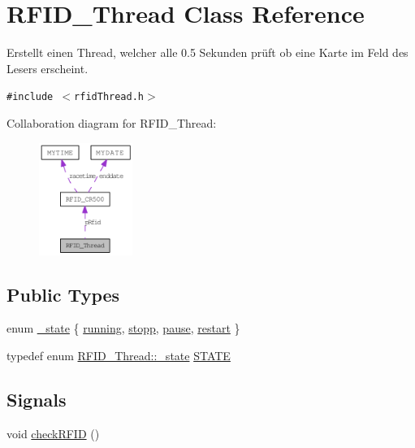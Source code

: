 \hypertarget{class_r_f_i_d___thread}{
\section{RFID\_\-Thread Class Reference}
\label{class_r_f_i_d___thread}
}
Erstellt einen Thread, welcher alle 0.5 Sekunden prüft ob eine Karte im Feld des Lesers erscheint.  


{\tt \#include $<$rfidThread.h$>$}

Collaboration diagram for RFID\_\-Thread:\nopagebreak
\begin{figure}[H]
\begin{center}
\leavevmode
\includegraphics[width=86pt]{class_r_f_i_d___thread__coll__graph}
\end{center}
\end{figure}
\subsection*{Public Types}
\begin{CompactItemize}
\item 
enum \hyperlink{class_r_f_i_d___thread_0c5695c7667faf1b1efe371bbfb81a77}{\_\-state} \{ \hyperlink{class_r_f_i_d___thread_0c5695c7667faf1b1efe371bbfb81a772bc7a4d5978016c397b5e14e788c03c0}{running}, 
\hyperlink{class_r_f_i_d___thread_0c5695c7667faf1b1efe371bbfb81a774af436f3cc3d02f80ac0eb3ad84e375c}{stopp}, 
\hyperlink{class_r_f_i_d___thread_0c5695c7667faf1b1efe371bbfb81a77eef055b595dcb36e33abc1095b9f5901}{pause}, 
\hyperlink{class_r_f_i_d___thread_0c5695c7667faf1b1efe371bbfb81a7726a2d1b6047b8e68bd0167ef98ac01c9}{restart}
 \}
\item 
typedef enum \hyperlink{class_r_f_i_d___thread_0c5695c7667faf1b1efe371bbfb81a77}{RFID\_\-Thread::\_\-state} \hyperlink{class_r_f_i_d___thread_44a4be086bc76f772174db2b9b389eb1}{STATE}
\end{CompactItemize}
\subsection*{Signals}
\begin{CompactItemize}
\item 
void \hyperlink{class_r_f_i_d___thread_9ad5963abb159cabb61ef91a201ffdfa}{checkRFID} ()
\end{CompactItemize}
